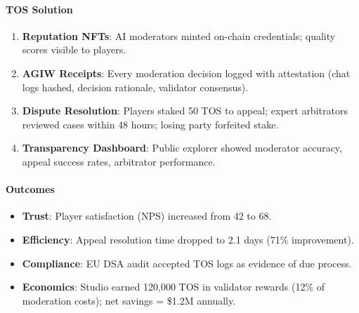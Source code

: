 \documentclass[11pt]{article}
\begin{document}
\begin{itemize}[noitemsep]
\begin{itemize}[noitemsep]
\begin{itemize}[noitemsep]
\begin{itemize}[noitemsep]
\begin{itemize}[noitemsep]
\begin{itemize}[noitemsep]
\paragraph{TOS Solution}
\begin{enumerate}[noitemsep]
  \item \textbf{Reputation NFTs}: AI moderators minted on-chain credentials; quality scores visible to players.
  \item \textbf{AGIW Receipts}: Every moderation decision logged with attestation (chat logs hashed, decision rationale, validator consensus).
  \item \textbf{Dispute Resolution}: Players staked 50 TOS to appeal; expert arbitrators reviewed cases within 48 hours; losing party forfeited stake.
  \item \textbf{Transparency Dashboard}: Public explorer showed moderator accuracy, appeal success rates, arbitrator performance.
\end{enumerate}

\paragraph{Outcomes}
\begin{itemize}[noitemsep]
  \item \textbf{Trust}: Player satisfaction (NPS) increased from 42 to 68.
  \item \textbf{Efficiency}: Appeal resolution time dropped to 2.1 days (71\% improvement).
  \item \textbf{Compliance}: EU DSA audit accepted TOS logs as evidence of due process.
  \item \textbf{Economics}: Studio earned 120,000 TOS in validator rewards (12\% of moderation costs); net savings = \$1.2M annually.
\end{itemize}


\end{itemize}
\end{itemize}
\end{itemize}
\end{itemize}
\end{itemize}
\end{itemize}
\end{document}
